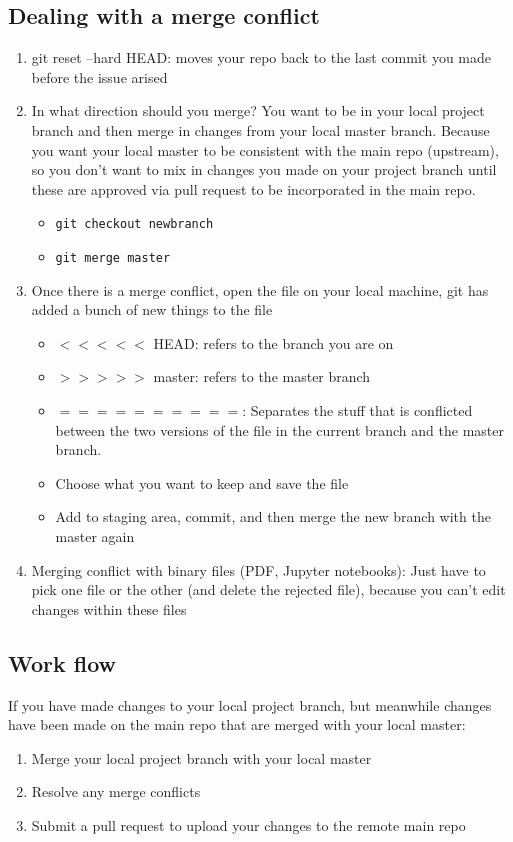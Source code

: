 \documentclass{article}
\begin{document}
\subsection{Dealing with a merge conflict}
\begin{enumerate}
	\item git reset --hard HEAD: moves your repo back to the last commit you made before the issue arised
	\item In what direction should you merge? You want to be in your local project branch and then merge in changes from your local master branch. Because you want your local master to be consistent with the main repo (upstream), so you don’t want to mix in changes you made on your project branch until these are approved via pull request to be incorporated in the main repo.
	\begin{itemize}
		\item \texttt{git checkout newbranch}
		\item \texttt{git merge master}
	\end{itemize}
	\item Once there is a merge conflict, open the file on your local machine, git has added a bunch of new things to the file
	\begin{itemize}
		\item $<<<<<$ HEAD: refers to the branch you are on
		\item $>>>>>$ master: refers to the master branch
		\item $==========$: Separates the stuff that is conflicted between the two versions of the file in the current branch and the master branch. 
		\item Choose what you want to keep and save the file
		\item Add to staging area, commit, and then merge the new branch with the master again
	\end{itemize}

	\item Merging conflict with binary files (PDF, Jupyter notebooks): Just have to pick one file or the other (and delete the rejected file), because you can’t edit changes within these files

\end{enumerate}

\subsection{Work flow}
If you have made changes to your local project branch, but meanwhile changes have been made on the main repo that are merged with your local master:
\begin{enumerate}
	\item Merge your local project branch with your local master
	\item Resolve any merge conflicts
	\item Submit a pull request to upload your changes to the remote main repo
\end{enumerate}
\end{document}
